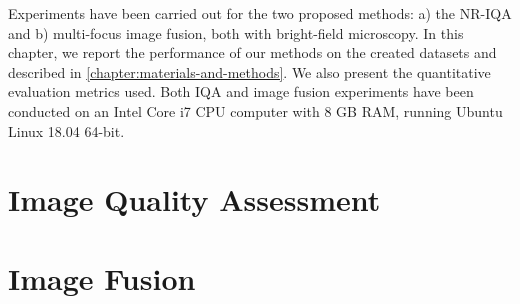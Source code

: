 Experiments have been carried out for the two proposed methods: a) the NR-IQA  and b) multi-focus image fusion, both with bright-field microscopy. In this chapter, we report the performance of our methods on the created datasets and described in \autoref{chapter:materials-and-methods}. We also present the quantitative evaluation metrics used. Both IQA and image fusion experiments have been conducted on an Intel Core i7 CPU computer with 8 GB RAM, running Ubuntu Linux 18.04 64-bit.



\section{Image Quality Assessment}


\section{Image Fusion}
